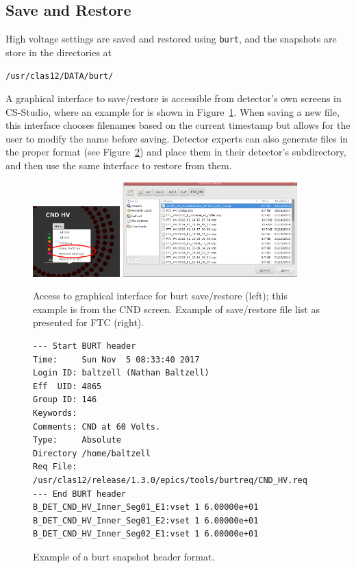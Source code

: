 \documentclass[amsmath,amssymb,notitlepage,11pt]{revtex4}
\begin{document}
\subsection{Save and Restore}
High voltage settings are saved and restored using \texttt{burt}, and the snapshots are store in the directories at
\begin{center}\texttt{/usr/clas12/DATA/burt/}\end{center}
    A graphical interface to save/restore is accessible from detector's own screens in CS-Studio, where an example for is shown in Figure~\ref{fig:burt}.  When saving a new file, this interface chooses filenames based on the current timestamp but allows for the user to modify the name before saving.  Detector experts can also generate files in the proper format (see Figure~\ref{fig:burt3}) and place them in their detector's subdirectory, and then use the same interface to restore from them.
\begin{figure}[htbp]\centering
    \includegraphics[width=0.3\textwidth]{pics/burt1}
    \includegraphics[width=0.6\textwidth]{pics/burt2}
    \caption{Access to graphical interface for burt save/restore (left); this example is from the CND screen.  Example of save/restore file list as presented for FTC (right).\label{fig:burt}}
\end{figure}

\begin{figure}[htbp]\centering
\begin{verbatim}
--- Start BURT header
Time:     Sun Nov  5 08:33:40 2017
Login ID: baltzell (Nathan Baltzell)
Eff  UID: 4865
Group ID: 146
Keywords: 
Comments: CND at 60 Volts. 
Type:     Absolute
Directory /home/baltzell
Req File: /usr/clas12/release/1.3.0/epics/tools/burtreq/CND_HV.req
--- End BURT header
B_DET_CND_HV_Inner_Seg01_E1:vset 1 6.00000e+01
B_DET_CND_HV_Inner_Seg01_E2:vset 1 6.00000e+01
B_DET_CND_HV_Inner_Seg02_E1:vset 1 6.00000e+01
\end{verbatim}
    \caption{Example of a burt snapshot header format.\label{fig:burt3}}
\end{figure}
\end{document}
